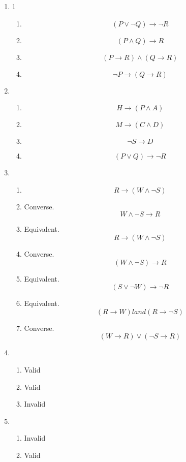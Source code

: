 \begin{enumerate}
    \item 1
    \begin{enumerate}
        \item \[(P \lor \lnot Q) \rightarrow \lnot R\]
        \item \[(P \land Q) \rightarrow R\]
        \item \[(P \rightarrow R) \land (Q \rightarrow R)\]
        \item \[\lnot P \rightarrow (Q \rightarrow R)\]
    \end{enumerate}
    \item 
    \begin{enumerate}
        \item \[H \rightarrow (P \land A)\]
        \item \[M \rightarrow (C \land D)\]
        \item \[\lnot S \rightarrow D\]
        \item \[(P \lor Q) \rightarrow \lnot R\]
    \end{enumerate}
    \item 
    \begin{enumerate}
        \item \[R \rightarrow (W \land \lnot S)\]
        \item Converse. \[W \land \lnot S \rightarrow R\]
        \item Equivalent. \[R \rightarrow (W \land \lnot S)\]
        \item Converse. \[(W \land \lnot S) \rightarrow R\]
        \item Equivalent. \[(S \lor \lnot W) \rightarrow \lnot R\]
        \item Equivalent. \[(R \rightarrow W) land (R \rightarrow \lnot S)\]
        \item Converse. \[(W \rightarrow R) \lor (\lnot S \rightarrow R)\]
    \end{enumerate}
    \item 
    \begin{enumerate}
        \item Valid
        \item Valid
        \item Invalid
    \end{enumerate}
    \item 
    \begin{enumerate}
        \item Invalid
        \item Valid

\end{enumerate}
\end{enumerate}
